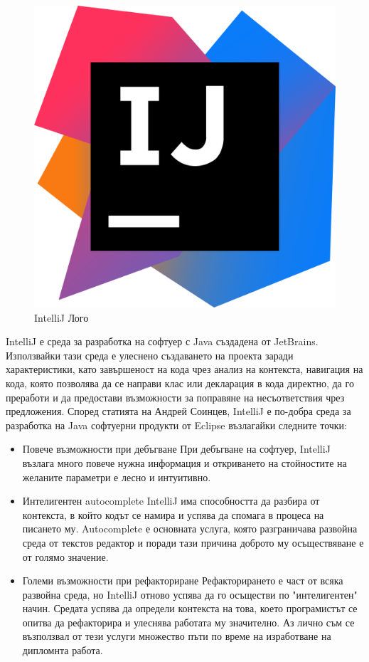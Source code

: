     
    \begin{figure}[h]
        \centering
        \includegraphics[scale=.06]{images/intellij.png}
        \caption{IntelliJ Лого}
        \label{fig:intelliJ}
    \end{figure}
    
    IntelliJ е среда за разработка на софтуер с Java създадена от JetBrains. Използвайки тази среда е улеснено създаването на проекта заради характеристики, като  завършеност на кода чрез анализ на контекста, навигация на кода, която позволява да се направи клас или декларация в кода директно, да го преработи и да предостави възможности за поправяне на несъответствия чрез предложения. Според статията на Андрей Соинцев\parencite{IntelliJ}, IntelliJ е по-добра среда за разработка на Java софтуерни продукти от Eclipse възлагайки следните точки:
    \begin{itemize}
        \item Повече възможности при дебъгване
            При дебъгване на софтуер, IntelliJ възлага много повече нужна информация и откриването на стойностите на желаните параметри е лесно и интуитивно.
        \item Интелигентен autocomplete
            IntelliJ има способността да разбира от контекста, в който кодът се намира и успява да спомага в процеса на писането му. Autocomplete е основната услуга, която разграничава развойна среда от текстов редактор и поради тази причина доброто му осъществяване е от голямо значение.
        \item Големи възможности при рефакториране
            Рефакторирането е част от всяка развойна среда, но IntelliJ отново успява да го осъществи по "интелигентен" начин. Средата успява да определи контекста на това, което програмистът се опитва да рефакторира и улеснява работата му значително. Аз лично съм се възползвал от тези услуги множество пъти по време на изработване на дипломнта работа.
    \end{itemize}
    

